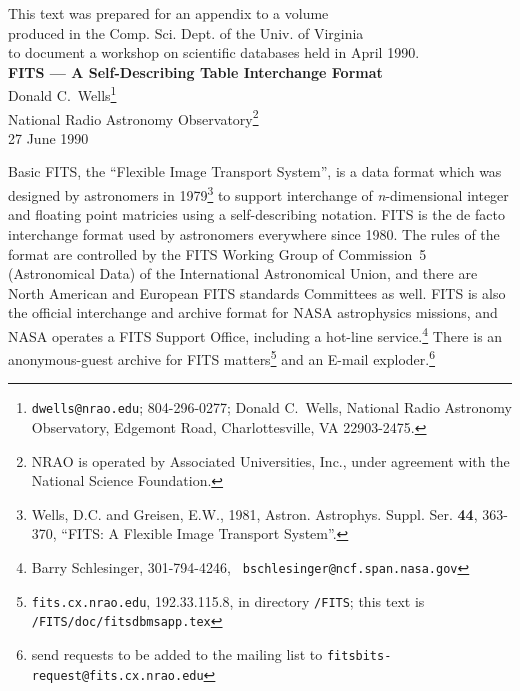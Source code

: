 \setlength{\textwidth}{135mm}



\begin{center}


This text was prepared for an appendix to a volume\\
produced in the Comp. Sci. Dept.  of the Univ. of Virginia\\
to document a workshop on scientific databases held in April 1990.\\[30mm]

{\large\bf FITS --- A Self-Describing Table Interchange Format}\\[10mm]

Donald C.~Wells\footnote{{\tt dwells@nrao.edu}; 804-296-0277; Donald
C.~Wells, National Radio Astronomy Observatory, Edgemont Road,
Charlottesville, VA 22903-2475.}\\[5mm]

National Radio Astronomy Observatory\footnote{NRAO is operated by Associated
Universities, Inc., under agreement with the National Science
Foundation.}\\[5mm]

27 June 1990\\[20mm]

\end{center}

Basic FITS, the ``Flexible Image Transport System'', is a data format
which was designed by astronomers in 1979\footnote{Wells, D.C. and
Greisen, E.W., 1981, Astron. Astrophys. Suppl. Ser. {\bf 44}, 363-370,
``FITS: A Flexible Image Transport System''.} to support interchange
of {\em n\/}-dimensional integer and floating point matricies using a
self-describing notation.  FITS is the de facto interchange format
used by astronomers everywhere since 1980.  The rules of the format
are controlled by the FITS Working Group of Commission~5 (Astronomical
Data) of the International Astronomical Union, and there are North
American and European FITS standards Committees as well. FITS is also
the official interchange and archive format for NASA astrophysics
missions, and NASA operates a FITS Support Office, including a
hot-line service.\footnote{Barry Schlesinger, 301-794-4246, {\tt
bschlesinger@ncf.span.nasa.gov}} There is an anonymous-guest archive
for FITS matters\footnote{{\tt fits.cx.nrao.edu}, 192.33.115.8, in
directory {\tt /FITS}; this text is {\tt /FITS/doc/fitsdbmsapp.tex}}
and an E-mail exploder.\footnote{send requests to be added to the
mailing list to {\tt fitsbits-request@fits.cx.nrao.edu}}

